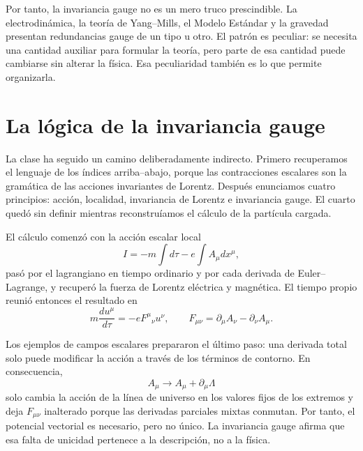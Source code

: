Por tanto, la invariancia gauge no es un mero truco prescindible. La electrodinámica, la teoría de Yang--Mills, el Modelo Estándar y la gravedad presentan redundancias gauge de un tipo u otro. El patrón es peculiar: se necesita una cantidad auxiliar para formular la teoría, pero parte de esa cantidad puede cambiarse sin alterar la física. Esa peculiaridad también es lo que permite organizarla.

\section{La lógica de la invariancia gauge}

La clase ha seguido un camino deliberadamente indirecto. Primero recuperamos el lenguaje de los índices arriba--abajo, porque las contracciones escalares son la gramática de las acciones invariantes de Lorentz. Después enunciamos cuatro principios: acción, localidad, invariancia de Lorentz e invariancia gauge. El cuarto quedó sin definir mientras reconstruíamos el cálculo de la partícula cargada.

El cálculo comenzó con la acción escalar local
\begin{equation}
I
=
-m\int d\tau
-e\int A_\mu dx^\mu,
\end{equation}
pasó por el lagrangiano en tiempo ordinario y por cada derivada de Euler--Lagrange, y recuperó la fuerza de Lorentz eléctrica y magnética. El tiempo propio reunió entonces el resultado en
\begin{equation}
m\frac{du^\mu}{d\tau}
=
-eF^\mu{}_\nu u^\nu,
\qquad
F_{\mu\nu}
=
\partial_\mu A_\nu-\partial_\nu A_\mu.
\end{equation}

Los ejemplos de campos escalares prepararon el último paso: una derivada total solo puede modificar la acción a través de los términos de contorno. En consecuencia,
\begin{equation}
A_\mu\longrightarrow A_\mu+\partial_\mu\Lambda
\end{equation}
solo cambia la acción de la línea de universo en los valores fijos de los extremos y deja \(F_{\mu\nu}\) inalterado porque las derivadas parciales mixtas conmutan. Por tanto, el potencial vectorial es necesario, pero no único. La invariancia gauge afirma que esa falta de unicidad pertenece a la descripción, no a la física.
